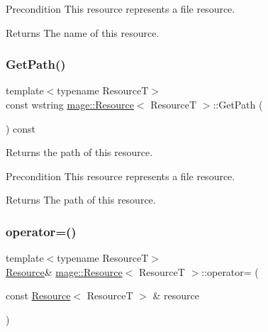 \begin{DoxyPrecond}{Precondition}
This resource represents a file resource. 
\end{DoxyPrecond}
\begin{DoxyReturn}{Returns}
The name of this resource. 
\end{DoxyReturn}
\mbox{\label{classmage_1_1_resource_a01cb4f6f8ff66a1f2545edc89af656c9}} 
\subsubsection{\texorpdfstring{Get\+Path()}{GetPath()}}
{\footnotesize\ttfamily template$<$typename ResourceT$>$ \\
const wstring \mbox{\hyperlink{classmage_1_1_resource}{mage\+::\+Resource}}$<$ ResourceT $>$\+::Get\+Path (\begin{DoxyParamCaption}{ }\end{DoxyParamCaption}) const}

Returns the path of this resource.

\begin{DoxyPrecond}{Precondition}
This resource represents a file resource. 
\end{DoxyPrecond}
\begin{DoxyReturn}{Returns}
The path of this resource. 
\end{DoxyReturn}
\mbox{\label{classmage_1_1_resource_a938159cb02ec565b9b957f993db4769d}} 
\subsubsection{\texorpdfstring{operator=()}{operator=()}\hspace{0.1cm}{\footnotesize\ttfamily [1/2]}}
{\footnotesize\ttfamily template$<$typename ResourceT$>$ \\
\mbox{\hyperlink{classmage_1_1_resource}{Resource}}\& \mbox{\hyperlink{classmage_1_1_resource}{mage\+::\+Resource}}$<$ ResourceT $>$\+::operator= (\begin{DoxyParamCaption}\item[{const \mbox{\hyperlink{classmage_1_1_resource}{Resource}}$<$ ResourceT $>$ \&}]{resource }\end{DoxyParamCaption})\hspace{0.3cm}{\ttfamily [delete]}}

